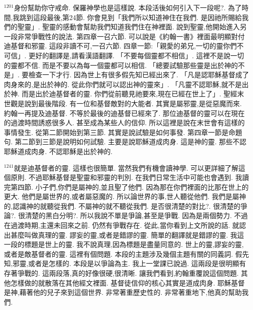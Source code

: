 \documentclass{book}
\begin{document}
$^{1201}$身份幫助你守戒命.
保羅神學也是這樣說.
本段活後如何引入下一段呢?.
為了時間,我跳到這段最後,第24節.
你會見到「我們所以知道神住在我們.
是因祂所賜給我們的聖靈」.
聖靈的感動會幫助我們知道我們住在神裡面.
說到聖靈,他開始進入另一段非常爭戰性的說法.
第四章一召六節.
可以說是《約翰一書》裡面最明顯對付迪基督和邪靈.
這段非讀不可,一召六節.
四章一節:「親愛的弟兄,一切的靈你們不可信」.
更好的翻譯是,請看漢語翻譯.
「不要每個靈都不相信」.
這裡不是說一切的靈都不信.
而是不要以為每一個靈都可以相信.
「總要試驗那些靈是出於神的不是」.
要檢查一下才行.
因為世上有很多假先知已經出來了.
「凡是認耶穌基督成了肉身來的,是出於神的.
從此你們就可以認出神的靈來」.
「凡靈不認耶穌,就不是出於神.
而是出於迪基督者的靈.
你們從前聽見祂要來,現在已經在世上了」.
聖經末世觀是說到最後階段.
有一位和基督敵對的大能者.
其實是屬邪靈,是從惡魔而來.
約翰一再提及迪基督.
不等於最後的迪基督已經來了.
那位迪基督的靈可以在現在的過渡時間誘惑很多人.
甚至成為某些人的信仰.
所以這裡是說在末世會有這樣的事情發生.
從第二節開始到第三節.
其實是說試驗是如何事發.
第四章一節是命題句.
第二節到三節是說明如何試驗.
主要是說耶穌道成肉身.
這是神的靈.
那些不認耶穌道成肉身.
不認耶穌是出於神的.

$^{1241}$就是迪基督者的靈.
這樣也很簡單.
當然我們有機會讀神學.
可以更詳細了解這個原則.
不過耶穌基督是聖靈和邪靈的判別.
在我們日常生活中可能也會遇到.
我讀完第四節.
小子們,你們是屬神的,並且聖了他們.
因為那在你們裡面的比那在世上的更大.
他們是屬世界的,或者屬惡魔的.
所以論世界的事,世人聽從他們.
我們是屬神的,認識神的就聽從我們.
不屬神的就不聽從我們.
是否很清楚的對比?.
很清楚的爭論?.
很清楚的黑白分明?.
所以我說不單是爭論,甚至是爭戰.
因為是兩個勢力.
不過在過渡時期,主還未回來之前.
仍然有爭戰存在.
從此,當你看到上文所說的話.
就認出甚麼叫做真理的靈.
謬妄的靈,或者是錯謬的靈.
簡單的翻譯就是錯謬的靈.
我這一段的標題是世上的靈.
我不說真理,因為標題是盡量同意的.
世上的靈,謬妄的靈,或者是敵基督者的靈.
這裡有個問題.
本段的主題涉及幾個主題有關的同義詞.
假先知,邪靈,或者是怎樣的.
本段是以爭論為主.
我上一堂課已說過.
這兩段是很明顯有存著爭戰的.
這兩段落,真的好像很硬,很清晰.
讓我們看到,約翰重覆說這個問題.
其他怎樣做的就散落在其他經文裡面.
基督徒信仰的核心其實是道成肉身.
耶穌基督是神,藉著他的兒子來到這個世界.
非常著重歷史性的.
非常著重地下,他真的幫助我們.
\end{document}
